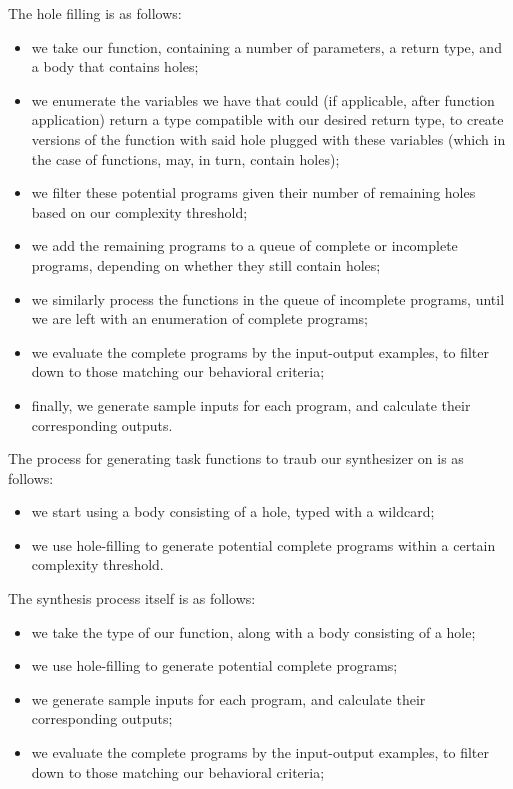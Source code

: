 \documentclass{article}
\begin{document}
The hole filling is as follows:
\begin{itemize}
    \item we take our function, containing a number of parameters, a return type, and a body that contains holes;
    \item we enumerate the variables we have that could (if applicable, after function application) return a type compatible with our desired return type, to create versions of the function with said hole plugged with these variables (which in the case of functions, may, in turn, contain holes);
    \item we filter these potential programs given their number of remaining holes based on our complexity threshold;
    \item we add the remaining programs to a queue of complete or incomplete programs, depending on whether they still contain holes;
    \item we similarly process the functions in the queue of incomplete programs, until we are left with an enumeration of complete programs;
    \item we evaluate the complete programs by the input-output examples, to filter down to those matching our behavioral criteria;
    \item finally, we generate sample inputs for each program, and calculate their corresponding outputs.
\end{itemize}

The process for generating task functions to traub our synthesizer on is as follows:
\begin{itemize}
    \item we start using a body consisting of a hole, typed with a wildcard;
    \item we use hole-filling to generate potential complete programs within a certain complexity threshold.
\end{itemize}

The synthesis process itself is as follows:
\begin{itemize}
    \item we take the type of our function, along with a body consisting of a hole;
    \item we use hole-filling to generate potential complete programs;
    \item we generate sample inputs for each program, and calculate their corresponding outputs;
    \item we evaluate the complete programs by the input-output examples, to filter down to those matching our behavioral criteria;
\end{itemize}
\end{document}
